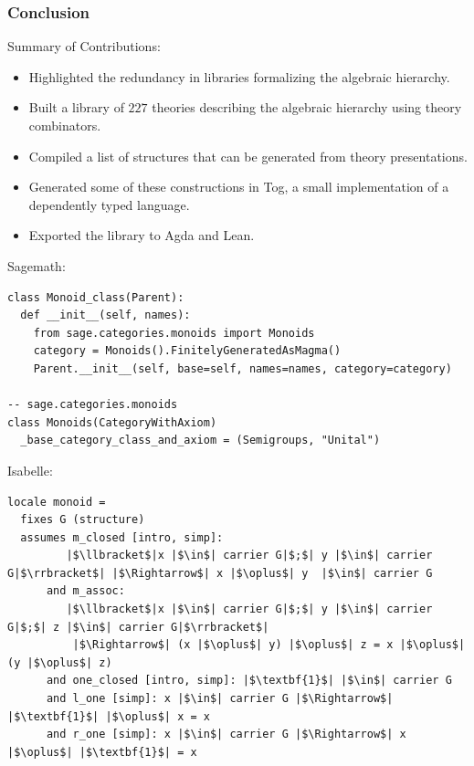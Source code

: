 \documentclass[t,10pt,numbers,fleqn,usenames,xcolor=dvipsnames]{beamer}
\begin{document}
\begin{frame}[fragile] 
\frametitle{Conclusion} 
Summary of Contributions: 
\begin{itemize}
\item Highlighted the redundancy in libraries formalizing the algebraic hierarchy.
\item Built a library of $227$ theories describing the algebraic hierarchy using theory combinators.
\item Compiled a list of structures that can be generated from theory presentations.
\item Generated some of these constructions in Tog, a small implementation of a dependently typed language.
\item Exported the library to Agda and Lean.
\end{itemize}
\end{frame}

\appendix

\plain{}

\begin{frame}[fragile] 
Sagemath: 
\begin{verbatim}
class Monoid_class(Parent):
  def __init__(self, names):
    from sage.categories.monoids import Monoids
    category = Monoids().FinitelyGeneratedAsMagma()
    Parent.__init__(self, base=self, names=names, category=category)

-- sage.categories.monoids 
class Monoids(CategoryWithAxiom)
  _base_category_class_and_axiom = (Semigroups, "Unital")
\end{verbatim}
Isabelle: 
\begin{verbatim}
locale monoid =
  fixes G (structure)
  assumes m_closed [intro, simp]:
         |$\llbracket$|x |$\in$| carrier G|$;$| y |$\in$| carrier G|$\rrbracket$| |$\Rightarrow$| x |$\oplus$| y  |$\in$| carrier G
      and m_assoc:
         |$\llbracket$|x |$\in$| carrier G|$;$| y |$\in$| carrier G|$;$| z |$\in$| carrier G|$\rrbracket$|
          |$\Rightarrow$| (x |$\oplus$| y) |$\oplus$| z = x |$\oplus$| (y |$\oplus$| z)
      and one_closed [intro, simp]: |$\textbf{1}$| |$\in$| carrier G
      and l_one [simp]: x |$\in$| carrier G |$\Rightarrow$| |$\textbf{1}$| |$\oplus$| x = x
      and r_one [simp]: x |$\in$| carrier G |$\Rightarrow$| x |$\oplus$| |$\textbf{1}$| = x
        
\end{verbatim} 
\end{frame}
\end{document}
